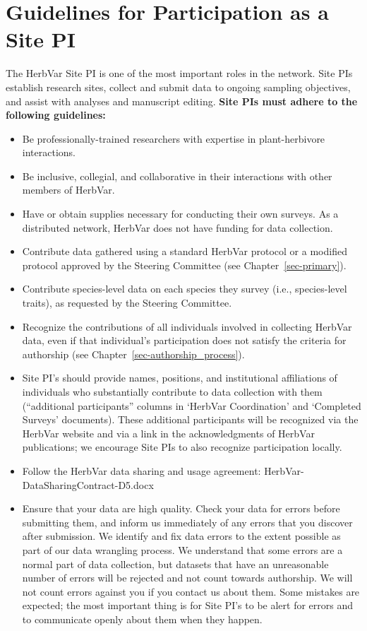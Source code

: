 \documentclass[
  letterpaper,
  oneside,
  open=any]{scrbook}
\providecommand{\tightlist}{%
  \setlength{\itemsep}{0pt}\setlength{\parskip}{0pt}}\usepackage{longtable,booktabs,array}
\begin{document}
\chapter{Guidelines for Participation as a Site PI}\label{sec-site_pi}

The HerbVar Site PI is one of the most important roles in the network.
Site PIs establish research sites, collect and submit data to ongoing
sampling objectives, and assist with analyses and manuscript editing.
\textbf{Site PIs must adhere to the following guidelines:}

\begin{itemize}
\tightlist
\item
  Be professionally-trained researchers with expertise in
  plant-herbivore interactions.
\item
  Be inclusive, collegial, and collaborative in their interactions with
  other members of HerbVar.
\item
  Have or obtain supplies necessary for conducting their own surveys. As
  a distributed network, HerbVar does not have funding for data
  collection.
\item
  Contribute data gathered using a standard HerbVar protocol or a
  modified protocol approved by the Steering Committee (see
  Chapter~\ref{sec-primary}).
\item
  Contribute species-level data on each species they survey (i.e.,
  species-level traits), as requested by the Steering Committee.
\item
  Recognize the contributions of all individuals involved in collecting
  HerbVar data, even if that individual's participation does not satisfy
  the criteria for authorship (see
  Chapter~\ref{sec-authorship_process}).
\item
  Site PI's should provide names, positions, and institutional
  affiliations of individuals who substantially contribute to data
  collection with them (``additional participants'' columns in `HerbVar
  Coordination' and `Completed Surveys' documents). These additional
  participants will be recognized via the HerbVar website and via a link
  in the acknowledgments of HerbVar publications; we encourage Site PIs
  to also recognize participation locally.
\item
  Follow the HerbVar data sharing and usage agreement:
  HerbVar-DataSharingContract-D5.docx
\item
  Ensure that your data are high quality. Check your data for errors
  before submitting them, and inform us immediately of any errors that
  you discover after submission. We identify and fix data errors to the
  extent possible as part of our data wrangling process. We understand
  that some errors are a normal part of data collection, but datasets
  that have an unreasonable number of errors will be rejected and not
  count towards authorship. We will not count errors against you if you
  contact us about them. Some mistakes are expected; the most important
  thing is for Site PI's to be alert for errors and to communicate
  openly about them when they happen.
\end{itemize}
\end{document}
